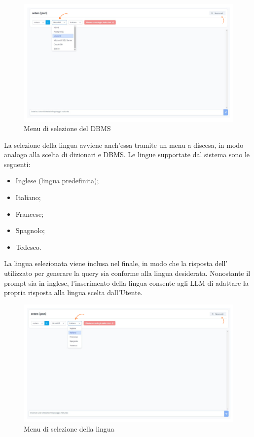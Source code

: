 \begin{figure}[H]
  \centering
  \includegraphics[width=\textwidth]{assets/cambio_dbms.png}
  \caption{Menu di selezione del DBMS}
\end{figure}

 \label{sec:lingua-chat}

\par La selezione della lingua avviene anch'essa tramite un menu a discesa, in modo analogo alla scelta di dizionari e DBMS. Le lingue supportate dal sistema sono le seguenti:
\begin{itemize}
  \item Inglese (lingua predefinita);
  \item Italiano;
  \item Francese;
  \item Spagnolo;
  \item Tedesco.
\end{itemize}

\vspace{0.5\baselineskip}
\par La lingua selezionata viene inclusa nel  finale, in modo che la risposta dell' utilizzato per generare la query  sia conforme alla lingua desiderata. Nonostante il prompt sia in inglese, l'inserimento della lingua consente agli LLM di adattare la propria risposta alla lingua scelta dall'Utente.

\begin{figure}[H]
  \centering
  \includegraphics[width=\textwidth]{assets/cambio_lingua.png}
  \caption{Menu di selezione della lingua}
\end{figure}

